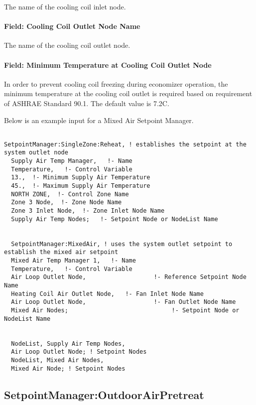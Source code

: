 The name of the cooling coil inlet node.

\paragraph{Field: Cooling Coil Outlet Node Name}\label{field-cooling-coil-outlet-node-name}

The name of the cooling coil outlet node.

\paragraph{Field: Minimum Temperature at Cooling Coil Outlet Node}\label{field-minimum-temperature-at-cooling-coil-outlet-node}

In order to prevent cooling coil freezing during economizer operation, the minimum temperature at the cooling coil outlet is required based on requirement of ASHRAE Standard 90.1. The default value is 7.2C.

Below is an example input for a Mixed Air Setpoint Manager.

\begin{lstlisting}

SetpointManager:SingleZone:Reheat, ! establishes the setpoint at the system outlet node
  Supply Air Temp Manager,   !- Name
  Temperature,   !- Control Variable
  13.,  !- Minimum Supply Air Temperature
  45.,  !- Maximum Supply Air Temperature
  NORTH ZONE,  !- Control Zone Name
  Zone 3 Node,  !- Zone Node Name
  Zone 3 Inlet Node,  !- Zone Inlet Node Name
  Supply Air Temp Nodes;   !- Setpoint Node or NodeList Name


  SetpointManager:MixedAir, ! uses the system outlet setpoint to establish the mixed air setpoint
  Mixed Air Temp Manager 1,   !- Name
  Temperature,   !- Control Variable
  Air Loop Outlet Node,                   !- Reference Setpoint Node Name
  Heating Coil Air Outlet Node,   !- Fan Inlet Node Name
  Air Loop Outlet Node,                   !- Fan Outlet Node Name
  Mixed Air Nodes;                             !- Setpoint Node or NodeList Name


  NodeList, Supply Air Temp Nodes,
  Air Loop Outlet Node; ! Setpoint Nodes
  NodeList, Mixed Air Nodes,
  Mixed Air Node; ! Setpoint Nodes
\end{lstlisting}

\subsection{SetpointManager:OutdoorAirPretreat}\label{setpointmanageroutdoorairpretreat}

